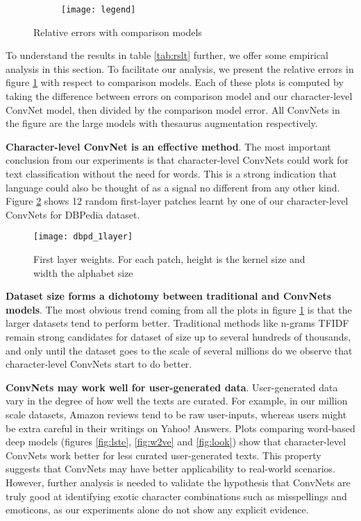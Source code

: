\documentclass{article} \usepackage{nips15submit_e,times}
\newenvironment{centerverbatim}{\par
  \centering
  \varwidth{\linewidth}\verbatim
}{\endverbatim
  \endvarwidth
  \par
}
\begin{document}
\begin{centerverbatim}
\begin{figure}[ht]
  \begin{subfigure}[b]{0.7\textwidth}
    \texttt{[image: legend]}
  \end{subfigure}
  
  \caption{Relative errors with comparison models}
  \label{fig:comp}
\end{figure}

To understand the results in table \ref{tab:rslt} further, we offer some empirical analysis in this section. To facilitate our analysis, we present the relative errors in figure \ref{fig:comp} with respect to comparison models. Each of these plots is computed by taking the difference between errors on comparison model and our character-level ConvNet model, then divided by the comparison model error. All ConvNets in the figure are the large models with thesaurus augmentation respectively.

\textbf{Character-level ConvNet is an effective method}. The most important conclusion from our experiments is that character-level ConvNets could work for text classification without the need for words. This is a strong indication that language could also be thought of as a signal no different from any other kind. Figure \ref{fig:weig} shows 12 random first-layer patches learnt by one of our character-level ConvNets for DBPedia dataset.

\begin{figure}[ht]
  \begin{center}
    \texttt{[image: dbpd\_1layer]}
  \end{center}
  \caption{First layer weights. For each patch, height is the kernel size and width the alphabet size}
  \label{fig:weig}
\end{figure}

\textbf{Dataset size forms a dichotomy between traditional and ConvNets models}. The most obvious trend coming from all the plots in figure \ref{fig:comp} is that the larger datasets tend to perform better. Traditional methods like n-grams TFIDF remain strong candidates for dataset of size up to several hundreds of thousands, and only until the dataset goes to the scale of several millions do we observe that character-level ConvNets start to do better.

\textbf{ConvNets may work well for user-generated data}. User-generated data vary in the degree of how well the texts are curated. For example, in our million scale datasets, Amazon reviews tend to be raw user-inputs, whereas users might be extra careful in their writings on Yahoo! Answers. Plots comparing word-based deep models (figures \ref{fig:lste}, \ref{fig:w2ve} and \ref{fig:look}) show that character-level ConvNets work better for less curated user-generated texts. This property suggests that ConvNets may have better applicability to real-world scenarios. However, further analysis is needed to validate the hypothesis that ConvNets are truly good at identifying exotic character combinations such as misspellings and emoticons, as our experiments alone do not show any explicit evidence.


\end{centerverbatim}
\end{document}
